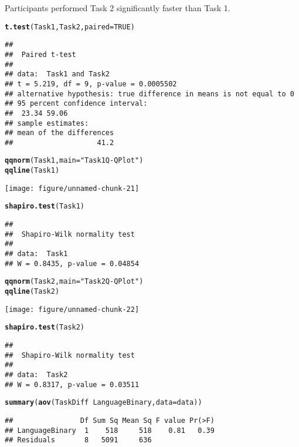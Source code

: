 \documentclass[12pt, twoside, a4paper, openright]{report}\usepackage[]{graphicx}\usepackage[]{color}
\makeatletter
\def\maxwidth{ %
  \ifdim\Gin@nat@width>\linewidth
    \linewidth
  \else
    \Gin@nat@width
  \fi
}
\newcommand{\hlnum}[1]{\textcolor[rgb]{0.686,0.059,0.569}{#1}}%
\newcommand{\hlstr}[1]{\textcolor[rgb]{0.192,0.494,0.8}{#1}}%
\newcommand{\hlopt}[1]{\textcolor[rgb]{0,0,0}{#1}}%
\newcommand{\hlstd}[1]{\textcolor[rgb]{0.345,0.345,0.345}{#1}}%
\newcommand{\hlkwc}[1]{\textcolor[rgb]{0.333,0.667,0.333}{#1}}%
\newcommand{\hlkwd}[1]{\textcolor[rgb]{0.737,0.353,0.396}{\textbf{#1}}}%
\newenvironment{kframe}{%
 \def\at@end@of@kframe{}%
 \ifinner\ifhmode%
  \def\at@end@of@kframe{\end{minipage}}%
  \begin{minipage}{\columnwidth}%
 \fi\fi%
 \def\FrameCommand##1{\hskip\@totalleftmargin \hskip-\fboxsep
 \colorbox{shadecolor}{##1}\hskip-\fboxsep
     \hskip-\linewidth \hskip-\@totalleftmargin \hskip\columnwidth}%
 \MakeFramed {\advance\hsize-\width
   \@totalleftmargin\z@ \linewidth\hsize
   \@setminipage}}%
 {\par\unskip\endMakeFramed%
 \at@end@of@kframe}
\newenvironment{knitrout}{}{} %
\makeatother
\begin{document}
Participants performed Task 2 significantly faster than Task 1.
\begin{knitrout}
\color{fgcolor}\begin{kframe}
\begin{alltt}
\hlkwd{t.test}\hlstd{(Task1, Task2,} \hlkwc{paired} \hlstd{=} \hlnum{TRUE}\hlstd{)}
\end{alltt}
\begin{verbatim}
## 
## 	Paired t-test
## 
## data:  Task1 and Task2
## t = 5.219, df = 9, p-value = 0.0005502
## alternative hypothesis: true difference in means is not equal to 0
## 95 percent confidence interval:
##  23.34 59.06
## sample estimates:
## mean of the differences 
##                    41.2
\end{verbatim}
\begin{alltt}
\hlkwd{qqnorm}\hlstd{(Task1,} \hlkwc{main} \hlstd{=} \hlstr{"Task 1 Q-Q Plot"}\hlstd{)}
\hlkwd{qqline}\hlstd{(Task1)}
\end{alltt}
\end{kframe}
\texttt{[image: figure/unnamed-chunk-21]} 
\begin{kframe}\begin{alltt}
\hlkwd{shapiro.test}\hlstd{(Task1)}
\end{alltt}
\begin{verbatim}
## 
## 	Shapiro-Wilk normality test
## 
## data:  Task1
## W = 0.8435, p-value = 0.04854
\end{verbatim}
\begin{alltt}
\hlkwd{qqnorm}\hlstd{(Task2,} \hlkwc{main} \hlstd{=} \hlstr{"Task 2 Q-Q Plot"}\hlstd{)}
\hlkwd{qqline}\hlstd{(Task2)}
\end{alltt}
\end{kframe}
\texttt{[image: figure/unnamed-chunk-22]} 
\begin{kframe}\begin{alltt}
\hlkwd{shapiro.test}\hlstd{(Task2)}
\end{alltt}
\begin{verbatim}
## 
## 	Shapiro-Wilk normality test
## 
## data:  Task2
## W = 0.8317, p-value = 0.03511
\end{verbatim}
\begin{alltt}
\hlkwd{summary}\hlstd{(}\hlkwd{aov}\hlstd{(TaskDiff} \hlopt{~} \hlstd{LanguageBinary,} \hlkwc{data} \hlstd{= data))}
\end{alltt}
\begin{verbatim}
##                Df Sum Sq Mean Sq F value Pr(>F)
## LanguageBinary  1    518     518    0.81   0.39
## Residuals       8   5091     636
\end{verbatim}
\end{kframe}
\end{knitrout}
\end{document}
